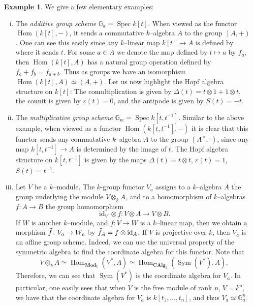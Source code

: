 \documentclass{article}
\theoremstyle{plain}
\theoremstyle{definition}
\newtheorem{Ex}[Th]{Example}
\DeclareMathOperator{\id}{id}
\DeclareMathOperator{\Hom}{Hom}
\DeclareMathOperator{\Spec}{Spec}
\DeclareMathOperator{\Sym}{Sym}
\begin{document}
\begin{Ex}\label{main examples} We give a few elementary examples:
    \begin{enumerate}[(i)]
    \item The \textit{additive group scheme} $\mathbb{G}_a=\Spec k[t]$. When viewed as the functor $\Hom(k[t], -)$, it sends a commutative $k$--algebra $A$ to the group $(A, +)$. One can see this easily since any $k$--linear map $k[t]\to A$ is defined by where it sends $t$. For some $a\in A$ we denote the map defined by $t\mapsto a$ by $f_a$, then $\Hom(k[t], A)$ has a natural group operation defined by $f_a + f_b=f_{a+b}$. Thus as groups we have an isomorphism $\Hom(k[t], A)\simeq (A, +)$. Let us now highlight the Hopf algebra structure on $k[t]$: The comultiplication is given by $\Delta(t)= t\otimes 1 + 1\otimes t$, the counit is given by $\varepsilon(t)=0$, and the antipode is given by $S(t)=-t$.
    \item The \textit{multiplicative group scheme} $\mathbb{G}_m=\Spec k[t, t^{-1}]$. Similar to the above example, when viewed as a functor $\Hom(k[t, t^{-1}], -)$ it is clear that this functor sends any commutative $k$--algebra $A$ to the group $(A^\times, \cdot)$, since any map $k[t, t^{-1}]\to A$ is determined by the image of $t$. The Hopf algebra structure on $k[t, t^{-1}]$ is given by the maps $\Delta(t)=t\otimes t$, $\varepsilon(t)=1$, $S(t)=t^{-1}$.
    
    \item Let $V$ be a $k$--module. The $k$-group functor $V_a$ assigns to a $k$--algebra $A$ the group underlying the module $V\otimes_k A$, and to a homomorphism of $k$--algebras $f\colon A\to B$ the group homomorphism 
    \[
    \id_V \otimes f \colon V\otimes A\to V\otimes B. 
    \]
    If $W$ is another $k$--module, and $f\colon V\to W$ is a $k$--linear map, then we obtain a morphism 
    $\Tilde{f}\colon V_a\to W_a $  by   $\Tilde{f}_A=f\otimes \id_A$.
    If $V$ is projective over $k$, then $V_a$ is an affine group scheme. Indeed,  we can use the universal property of the symmetric algebra to find the coordinate algebra for this functor. Note that 
    \[
    V\otimes_k A \simeq\Hom_{\textbf{Mod}_k}(V^*, A) \simeq \Hom_{\textbf{CAlg}_k}(\Sym(V^*), A).
    \]
    Therefore, we can see that $\Sym(V^*)$ is the coordinate algebra for $V_a$. In particular, one easily sees that when $V$ is the free module of rank $n$, $V=k^n$, we have that the coordinate algebra for $V_a$ is $k[t_1, \dots, t_n]$, and thus $V_a\simeq \mathbb{G}_a^n$. 
    

\end{enumerate}
\end{Ex}
\end{document}
